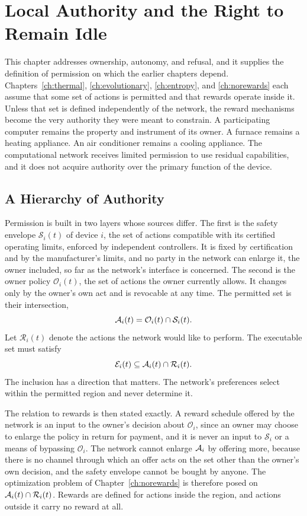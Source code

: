 \chapter{Local Authority and the Right to Remain Idle}
\label{ch:idle}

This chapter addresses ownership, autonomy, and refusal, and it supplies the definition of permission on which the earlier chapters depend. Chapters~\ref{ch:thermal}, \ref{ch:evolutionary}, \ref{ch:entropy}, and \ref{ch:norewards} each assume that some set of actions is permitted and that rewards operate inside it. Unless that set is defined independently of the network, the reward mechanisms become the very authority they were meant to constrain. A participating computer remains the property and instrument of its owner. A furnace remains a heating appliance. An air conditioner remains a cooling appliance. The computational network receives limited permission to use residual capabilities, and it does not acquire authority over the primary function of the device.

\section{A Hierarchy of Authority}

Permission is built in two layers whose sources differ. The first is the safety envelope $\mathcal S_i(t)$ of device $i$, the set of actions compatible with its certified operating limits, enforced by independent controllers. It is fixed by certification and by the manufacturer's limits, and no party in the network can enlarge it, the owner included, so far as the network's interface is concerned. The second is the owner policy $\mathcal O_i(t)$, the set of actions the owner currently allows. It changes only by the owner's own act and is revocable at any time. The permitted set is their intersection,
\[
\mathcal{A}_i(t)=\mathcal O_i(t)\cap\mathcal S_i(t).
\]
Let $\mathcal R_i(t)$ denote the actions the network would like to perform. The executable set must satisfy
\[
\mathcal E_i(t)\subseteq\mathcal{A}_i(t)\cap\mathcal R_i(t).
\]
The inclusion has a direction that matters. The network's preferences select within the permitted region and never determine it.

The relation to rewards is then stated exactly. A reward schedule offered by the network is an input to the owner's decision about $\mathcal O_i$, since an owner may choose to enlarge the policy in return for payment, and it is never an input to $\mathcal S_i$ or a means of bypassing $\mathcal O_i$. The network cannot enlarge $\mathcal{A}_i$ by offering more, because there is no channel through which an offer acts on the set other than the owner's own decision, and the safety envelope cannot be bought by anyone. The optimization problem of Chapter~\ref{ch:norewards} is therefore posed on $\mathcal{A}_i(t)\cap\mathcal R_i(t)$. Rewards are defined for actions inside the region, and actions outside it carry no reward at all.

